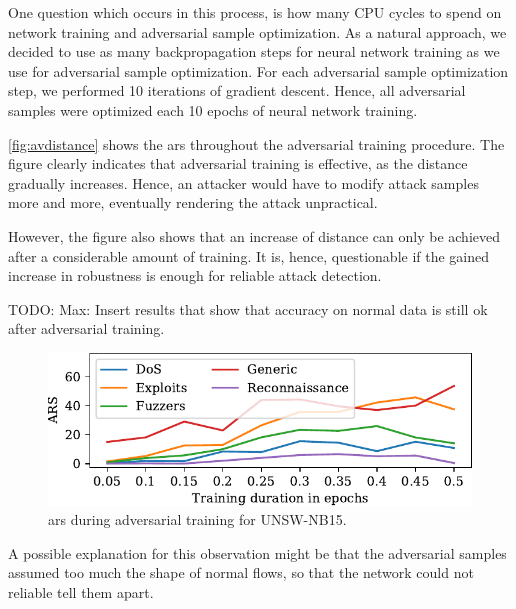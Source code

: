 \documentclass[conference]{IEEEtran}
\newcommand\note[2]{{\color{#1}#2}}
\newcommand\todo[1]{{\note{red}{TODO: #1}}}
\begin{document}
One question which occurs in this process, is how many CPU cycles to spend on network training and adversarial sample optimization. As a natural approach, we decided to use as many backpropagation steps for neural network training as we use for adversarial sample optimization.  For each adversarial sample optimization step, we performed 10 iterations of gradient descent. Hence, all adversarial samples were optimized each 10 epochs of neural network training.

\autoref{fig:avdistance} shows the \gls{ars} throughout the adversarial training procedure. The figure clearly indicates that adversarial training is effective, as the distance gradually increases. Hence, an attacker would have to modify attack samples more and more, eventually rendering the attack unpractical.

However, the figure also shows that an increase of distance can only be achieved after a considerable amount of training. It is, hence, questionable if the gained increase in robustness is enough for reliable attack detection.

\todo{Max: Insert results that show that accuracy on normal data is still ok after adversarial training.}

\begin{figure}
\includegraphics[width=\columnwidth]{../plots/ars/ars_15.pdf}
\caption{\gls{ars} during adversarial training for UNSW-NB15.}
\label{fig:avdistance}
\end{figure}


A possible explanation for this observation might be that the adversarial samples assumed too much the shape of normal flows, so that the network could not reliable tell them apart.
\end{document}
